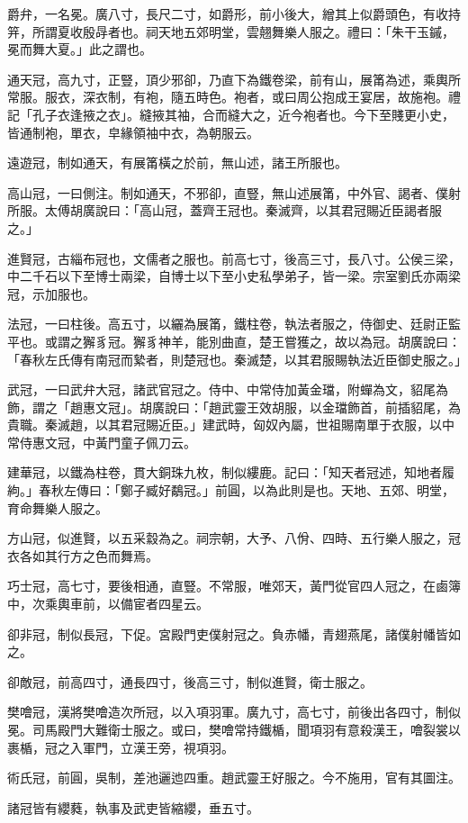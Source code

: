 \begin{pinyinscope}
爵弁，一名冕。廣八寸，長尺二寸，如爵形，前小後大，繒其上似爵頭色，有收持笄，所謂夏收殷冔者也。祠天地五郊明堂，雲翹舞樂人服之。禮曰：「朱干玉鏚，冕而舞大夏。」此之謂也。

通天冠，高九寸，正豎，頂少邪卻，乃直下為鐵卷梁，前有山，展筩為述，乘輿所常服。服衣，深衣制，有袍，隨五時色。袍者，或曰周公抱成王宴居，故施袍。禮記「孔子衣逢掖之衣」。縫掖其袖，合而縫大之，近今袍者也。今下至賤更小史，皆通制袍，單衣，皁緣領袖中衣，為朝服云。

遠遊冠，制如通天，有展筩橫之於前，無山述，諸王所服也。

高山冠，一曰側注。制如通天，不邪卻，直豎，無山述展筩，中外官、謁者、僕射所服。太傅胡廣說曰：「高山冠，蓋齊王冠也。秦滅齊，以其君冠賜近臣謁者服之。」

進賢冠，古緇布冠也，文儒者之服也。前高七寸，後高三寸，長八寸。公侯三梁，中二千石以下至博士兩梁，自博士以下至小史私學弟子，皆一梁。宗室劉氏亦兩梁冠，示加服也。

法冠，一曰柱後。高五寸，以纚為展筩，鐵柱卷，執法者服之，侍御史、廷尉正監平也。或謂之獬豸冠。獬豸神羊，能別曲直，楚王嘗獲之，故以為冠。胡廣說曰：「春秋左氏傳有南冠而縶者，則楚冠也。秦滅楚，以其君服賜執法近臣御史服之。」

武冠，一曰武弁大冠，諸武官冠之。侍中、中常侍加黃金璫，附蟬為文，貂尾為飾，謂之「趙惠文冠」。胡廣說曰：「趙武靈王效胡服，以金璫飾首，前插貂尾，為貴職。秦滅趙，以其君冠賜近臣。」建武時，匈奴內屬，世祖賜南單于衣服，以中常侍惠文冠，中黃門童子佩刀云。

建華冠，以鐵為柱卷，貫大銅珠九枚，制似縷鹿。記曰：「知天者冠述，知地者履絇。」春秋左傳曰：「鄭子臧好鷸冠。」前圓，以為此則是也。天地、五郊、明堂，育命舞樂人服之。

方山冠，似進賢，以五采縠為之。祠宗朝，大予、八佾、四時、五行樂人服之，冠衣各如其行方之色而舞焉。

巧士冠，高七寸，要後相通，直豎。不常服，唯郊天，黃門從官四人冠之，在鹵簿中，次乘輿車前，以備宦者四星云。

卻非冠，制似長冠，下促。宮殿門吏僕射冠之。負赤幡，青翅燕尾，諸僕射幡皆如之。

卻敵冠，前高四寸，通長四寸，後高三寸，制似進賢，衛士服之。

樊噲冠，漢將樊噲造次所冠，以入項羽軍。廣九寸，高七寸，前後出各四寸，制似冕。司馬殿門大難衛士服之。或曰，樊噲常持鐵楯，聞項羽有意殺漢王，噲裂裳以裹楯，冠之入軍門，立漢王旁，視項羽。

術氏冠，前圓，吳制，差池邐迆四重。趙武靈王好服之。今不施用，官有其圖注。

諸冠皆有纓蕤，執事及武吏皆縮纓，垂五寸。


\end{pinyinscope}

